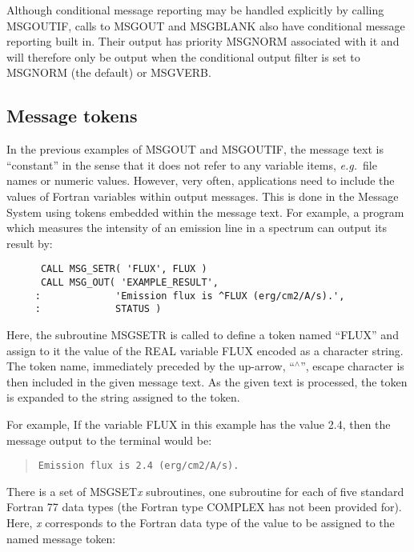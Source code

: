 \documentclass[twoside,11pt]{article}
\newcommand{\xlabel}[1]{}
\renewcommand{\_}{\texttt{\symbol{95}}}
\begin{document}
Although conditional message reporting may be handled explicitly by calling
MSG\_OUTIF, calls to MSG\_OUT and MSG\_BLANK also have conditional message
reporting built in.
Their output has priority MSG\_\_NORM associated with it and will therefore
only be output when the conditional output filter is set to MSG\_\_NORM (the 
default) or MSG\_\_VERB.

\subsection{\xlabel{message_tokens}Message tokens}
In the previous examples of MSG\_OUT and MSG\_OUTIF, the message text is 
``constant'' in the sense that it does not refer to any variable items, 
\textit{e.g.}\ file names or numeric values. 
However, very often, applications need to include the values of Fortran 
variables within output messages. 
This is done in the Message System using tokens embedded within the message
text.
For example, a program which measures the intensity of an emission line in
a spectrum can output its result by:

\begin {small}
\begin{verbatim}
      CALL MSG_SETR( 'FLUX', FLUX )
      CALL MSG_OUT( 'EXAMPLE_RESULT', 
     :             'Emission flux is ^FLUX (erg/cm2/A/s).',
     :             STATUS )
\end{verbatim}
\end {small}

Here, the subroutine MSG\_SETR is called to define a token named ``FLUX''
and assign to it the value of the REAL variable FLUX encoded as a character 
string.
The token name, immediately preceded by the up-arrow, ``$^\wedge$'', escape 
character is then included in the given message text. 
As the given text is processed, the token is expanded to the string assigned to
the token.

For example, If the variable FLUX in this example has the value 2.4, then
the message output to the terminal would be:

\begin {quote}
\begin {small}
\begin{verbatim}
Emission flux is 2.4 (erg/cm2/A/s).
\end{verbatim}
\end {small}
\end {quote}

There is a set of MSG\_SET\textit{x} subroutines, one subroutine for each of five
standard Fortran 77 data types (the Fortran type COMPLEX has not been provided
for).
Here, \textit{x} corresponds to the Fortran data type of the value to be assigned
to the named message token:
\end{document}

